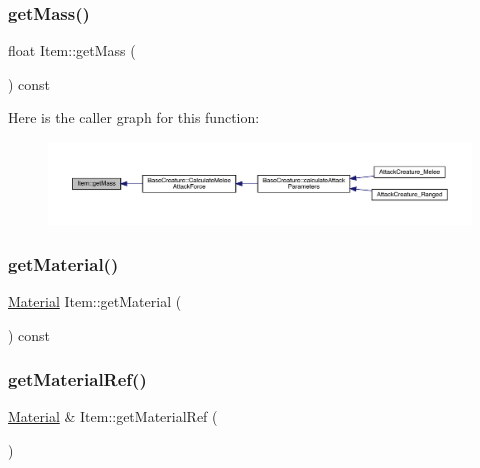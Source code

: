 \subsubsection{\texorpdfstring{get\+Mass()}{getMass()}}
{\footnotesize\ttfamily float Item\+::get\+Mass (\begin{DoxyParamCaption}{ }\end{DoxyParamCaption}) const}

Here is the caller graph for this function\+:
\nopagebreak
\begin{figure}[H]
\begin{center}
\leavevmode
\includegraphics[width=350pt]{class_item_a452c0983b99f1b148949274b63ed79fd_icgraph}
\end{center}
\end{figure}
\mbox{\label{class_item_ada6692d4e0e9e8f9a9a78a13fd6522d8}} 
\subsubsection{\texorpdfstring{get\+Material()}{getMaterial()}}
{\footnotesize\ttfamily \mbox{\hyperlink{class_material}{Material}} Item\+::get\+Material (\begin{DoxyParamCaption}{ }\end{DoxyParamCaption}) const}

\mbox{\label{class_item_af22ec5d207b70e2a3359e76dccfc7e11}} 
\subsubsection{\texorpdfstring{get\+Material\+Ref()}{getMaterialRef()}}
{\footnotesize\ttfamily \mbox{\hyperlink{class_material}{Material}} \& Item\+::get\+Material\+Ref (\begin{DoxyParamCaption}{ }\end{DoxyParamCaption})}

